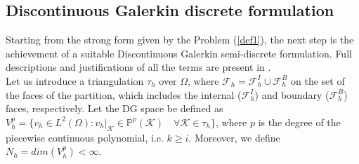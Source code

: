 \documentclass[a4paper,11pt]{article}
\begin{document}
    \subsection{Discontinuous Galerkin discrete formulation}
    Starting from the strong form given by the Problem (\ref{def1}), the next step is the achievement of a suitable Discontinuous Galerkin semi-discrete formulation. Full descriptions and justifications of all the terms are present in \cite{marta} . \\
    Let us introduce a triangulation $\tau_h$ over $\Omega$, where $\mathcal{F} _h=\mathcal{F} _h^I \cup \mathcal{F} _h^B$ on the set of the faces of the partition, which includes the internal ($\mathcal{F} _h^I$) and boundary ($\mathcal{F} _h^B$) faces, respectively. Let the DG space be defined as $V_h^p = \{v_h \in L^2(\Omega) : v_h|_\mathcal{K} \in \mathbb{P}^{p}(\mathcal{K})  \quad \forall \mathcal{K} \in \tau_h \}$, where $p$ is the degree of the piecewise continuous polynomial, i.e. $k \geq i$. Moreover, we define $N_h=dim(V_h^p)<\infty$. \vspace{4mm}
\end{document}

